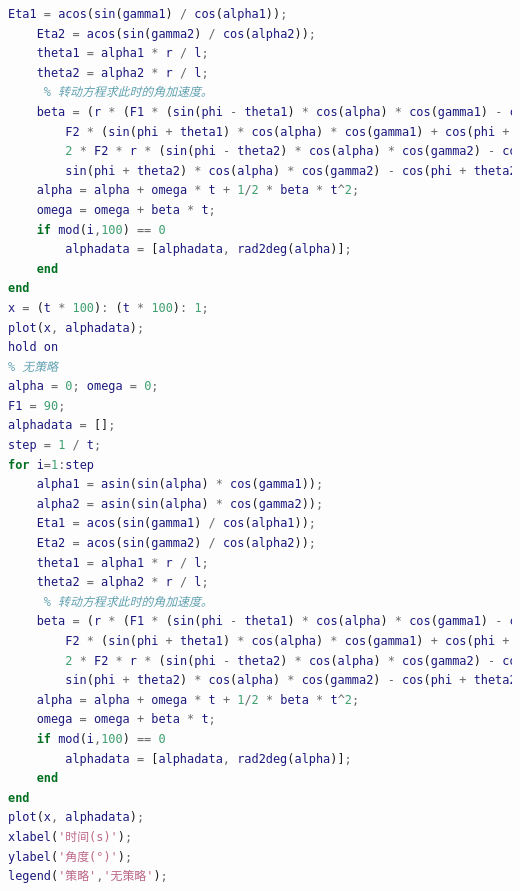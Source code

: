\documentclass{cumcm}
\begin{document}
\begin{lstlisting}[language=matlab]
    Eta1 = acos(sin(gamma1) / cos(alpha1));
    Eta2 = acos(sin(gamma2) / cos(alpha2));
    theta1 = alpha1 * r / l;
    theta2 = alpha2 * r / l;
     % 转动方程求此时的角加速度。
    beta = (r * (F1 * (sin(phi - theta1) * cos(alpha) * cos(gamma1) - cos(phi - theta1) * sin(alpha1) * sin(Eta1)) - ...
        F2 * (sin(phi + theta1) * cos(alpha) * cos(gamma1) + cos(phi + theta1) * sin(alpha1) * sin(Eta1))) + ...
        2 * F2 * r * (sin(phi - theta2) * cos(alpha) * cos(gamma2) - cos(phi - theta2) * sin(alpha2) * sin(Eta2) - ...
        sin(phi + theta2) * cos(alpha) * cos(gamma2) - cos(phi + theta2) * sin(alpha2) * sin(Eta2))) / J;
    alpha = alpha + omega * t + 1/2 * beta * t^2;
    omega = omega + beta * t;
    if mod(i,100) == 0
        alphadata = [alphadata, rad2deg(alpha)];
    end
end
x = (t * 100): (t * 100): 1;
plot(x, alphadata);
hold on
% 无策略
alpha = 0; omega = 0;
F1 = 90;
alphadata = [];
step = 1 / t;
for i=1:step
    alpha1 = asin(sin(alpha) * cos(gamma1));
    alpha2 = asin(sin(alpha) * cos(gamma2));
    Eta1 = acos(sin(gamma1) / cos(alpha1));
    Eta2 = acos(sin(gamma2) / cos(alpha2));
    theta1 = alpha1 * r / l;
    theta2 = alpha2 * r / l;
     % 转动方程求此时的角加速度。
    beta = (r * (F1 * (sin(phi - theta1) * cos(alpha) * cos(gamma1) - cos(phi - theta1) * sin(alpha1) * sin(Eta1)) - ...
        F2 * (sin(phi + theta1) * cos(alpha) * cos(gamma1) + cos(phi + theta1) * sin(alpha1) * sin(Eta1))) + ...
        2 * F2 * r * (sin(phi - theta2) * cos(alpha) * cos(gamma2) - cos(phi - theta2) * sin(alpha2) * sin(Eta2) - ...
        sin(phi + theta2) * cos(alpha) * cos(gamma2) - cos(phi + theta2) * sin(alpha2) * sin(Eta2))) / J;
    alpha = alpha + omega * t + 1/2 * beta * t^2;
    omega = omega + beta * t;
    if mod(i,100) == 0
        alphadata = [alphadata, rad2deg(alpha)];
    end
end
plot(x, alphadata);
xlabel('时间(s)');
ylabel('角度(°)');
legend('策略','无策略');
\end{lstlisting}
\end{document}
